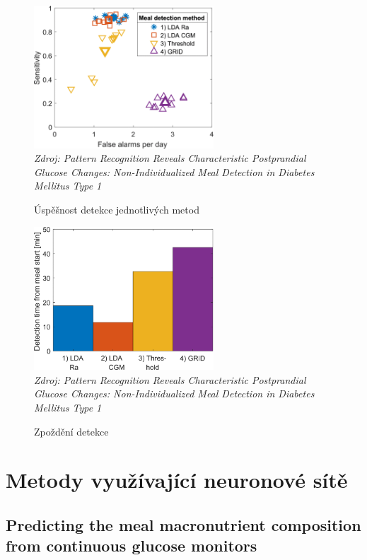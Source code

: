\begin{figure}[H]
\caption{Úspěšnost detekce jednotlivých metod}
\label{fig:lda1}
\centering
\includegraphics[width=0.6\textwidth]{img/analyza/lda1.png}\\
\textit{Zdroj: Pattern Recognition Reveals Characteristic Postprandial Glucose Changes: Non-Individualized Meal Detection in Diabetes Mellitus Type 1 \citep{Analyza.LDA}}
\end{figure}
\begin{figure}[H]
\caption{Zpoždění detekce}
\label{fig:lda2}
\centering
\includegraphics[width=0.6\textwidth]{img/analyza/lda2.png}\\
\textit{Zdroj: Pattern Recognition Reveals Characteristic Postprandial Glucose Changes: Non-Individualized Meal Detection in Diabetes Mellitus Type 1 \citep{Analyza.LDA}}
\end{figure}


\section{Metody využívající neuronové sítě}
\subsection{Predicting the meal macronutrient composition from continuous glucose monitors}
\label{ch:neuronka}


